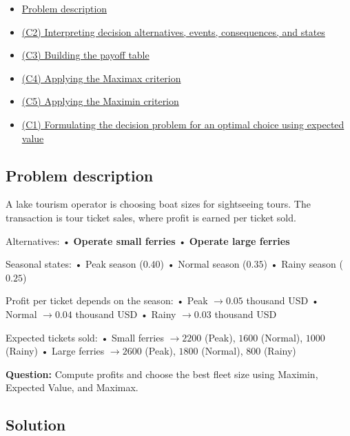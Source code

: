 \documentclass[11pt]{article}
\begin{document}
	\begin{itemize}
		\item \hyperlink{problem7-problem}{Problem description}
		\item \hyperlink{problem7-c2}{(C2) Interpreting decision alternatives, events, consequences, and states}
		\item \hyperlink{problem7-c3}{(C3) Building the payoff table}
		\item \hyperlink{problem7-c4}{(C4) Applying the Maximax criterion}
		\item \hyperlink{problem7-c5}{(C5) Applying the Maximin criterion}
		\item \hyperlink{problem7-c1}{(C1) Formulating the decision problem for an optimal choice using expected value}
	\end{itemize}
	
	
	\subsection*{Problem description}
	
	\hypertarget{problem7-problem}{}
	
	A lake tourism operator is choosing boat sizes for sightseeing tours. The transaction is tour ticket sales, where profit
	is earned per ticket sold.
	
	
	
	
	
	
	Alternatives:
	• \textbf{Operate small ferries}
	• \textbf{Operate large ferries}
	
	
	
	
	Seasonal states:
	• Peak season ($0.40$)
	• Normal season ($0.35$)
	• Rainy season ($0.25$)
	
	
	
	
	
	
	Profit per ticket depends on the season:
	• Peak $\to 0.05$ thousand USD
	• Normal $\to 0.04$ thousand USD
	• Rainy $\to 0.03$ thousand USD
	
	
	
	
	
	
	Expected tickets sold:
	• Small ferries $\to 2200$ (Peak), $1600$ (Normal), $1000$ (Rainy)
	• Large ferries $\to 2600$ (Peak), $1800$ (Normal), $800$ (Rainy)
	
	
	
	
	
	\textbf{Question:} Compute profits and choose the best fleet size using Maximin, Expected Value, and Maximax.
	
	\subsection*{Solution}
	
\end{document}
